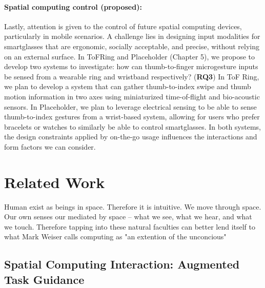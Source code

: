 \documentclass [11pt, proquest] {uwthesis}[2020/02/24]
\begin{document}
\subsubsection{Spatial computing control (proposed):} Lastly, attention is given to the control of future spatial computing devices, particularly in mobile scenarios. A challenge lies in designing input modalities for smartglasses that are ergonomic, socially acceptable, and precise, without relying on an external surface. In ToFRing and Placeholder (Chapter 5), we propose to develop two systems to investigate: how can thumb-to-finger microgesture inputs be sensed from a wearable ring and wristband respectively? (\textbf{RQ3}) In ToF Ring, we plan to develop a system that can gather thumb-to-index swipe and thumb motion information in two axes using miniaturized time-of-flight and bio-acoustic sensors. In Placeholder, we plan to leverage electrical sensing to be able to sense thumb-to-index gestures from a wrist-based system, allowing for users who prefer bracelets or watches to similarly be able to control smartglasses. In both systems, the design constraints applied by on-the-go usage influences the interactions and form factors we can consider.

 
\chapter{Related Work}
\label{sec:related}

Human exist as beings in space. Therefore it is intuitive.
We move through space. Our own senses our mediated by space  -- what we see, what we hear, and what we touch. Therefore tapping into these natural faculties can better lend itself to what Mark Weiser calls computing as "an extention of the unconcious"

\section{Spatial Computing Interaction: Augmented Task Guidance}
\end{document}
